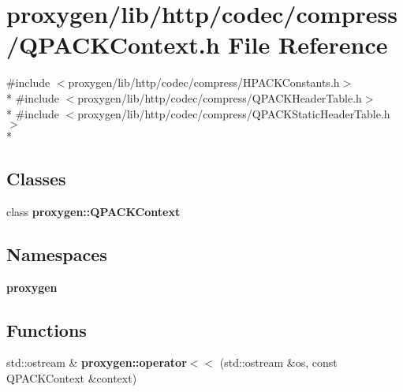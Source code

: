 \section{proxygen/lib/http/codec/compress/\+Q\+P\+A\+C\+K\+Context.h File Reference}
\label{QPACKContext_8h}
{\ttfamily \#include $<$proxygen/lib/http/codec/compress/\+H\+P\+A\+C\+K\+Constants.\+h$>$}\\*
{\ttfamily \#include $<$proxygen/lib/http/codec/compress/\+Q\+P\+A\+C\+K\+Header\+Table.\+h$>$}\\*
{\ttfamily \#include $<$proxygen/lib/http/codec/compress/\+Q\+P\+A\+C\+K\+Static\+Header\+Table.\+h$>$}\\*
\subsection*{Classes}
\begin{DoxyCompactItemize}
\item 
class {\bf proxygen\+::\+Q\+P\+A\+C\+K\+Context}
\end{DoxyCompactItemize}
\subsection*{Namespaces}
\begin{DoxyCompactItemize}
\item 
 {\bf proxygen}
\end{DoxyCompactItemize}
\subsection*{Functions}
\begin{DoxyCompactItemize}
\item 
std\+::ostream \& {\bf proxygen\+::operator$<$$<$} (std\+::ostream \&os, const Q\+P\+A\+C\+K\+Context \&context)
\end{DoxyCompactItemize}
